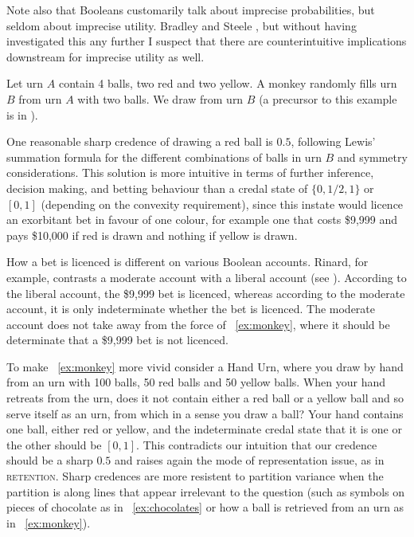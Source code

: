\documentclass[phd,12pt,oneside]{ubcthesis}
\begin{document}
Note also that Booleans customarily talk about imprecise
probabilities, but seldom about imprecise utility. Bradley and Steele
, but without having investigated this
any further I suspect that there are counterintuitive implications
downstream for imprecise utility as well. 

\begin{quotex}
  \label{ex:monkey} Let urn $A$ contain 4
  balls, two red and two yellow. A monkey randomly fills urn $B$ from
  urn $A$ with two balls. We draw from urn $B$ (a precursor to this
  example is in ).
\end{quotex}

One reasonable sharp credence of drawing a red ball is $0.5$,
following Lewis' summation formula for the different combinations of
balls in urn $B$ and symmetry considerations. This solution is more
intuitive in terms of further inference, decision making, and betting
behaviour than a credal state of $\{0,1/2,1\}$ or $[0,1]$ (depending
on the convexity requirement), since this instate would licence an
exorbitant bet in favour of one colour, for example one that costs
\$9,999 and pays \$10,000 if red is drawn and nothing if yellow is
drawn.

How a bet is licenced is different on various Boolean accounts.
Rinard, for example, contrasts a moderate account with a liberal
account (see ). According to the liberal
account, the \$9,999 bet is licenced, whereas according to the
moderate account, it is only indeterminate whether the bet is
licenced. The moderate account does not take away from the force of
{\xample}~\ref{ex:monkey}, where it should be determinate that a \$9,999
bet is not licenced.

To make {\xample}~\ref{ex:monkey} more vivid consider a Hand Urn, where
you draw by hand from an urn with 100 balls, 50 red balls and 50
yellow balls. When your hand retreats from the urn, does it not
contain either a red ball or a yellow ball and so serve itself as an
urn, from which in a sense you draw a ball? Your hand contains one
ball, either red or yellow, and the indeterminate credal state that it
is one or the other should be $[0,1]$. This contradicts our intuition
that our credence should be a sharp $0.5$ and raises again the mode of
representation issue, as in \textsc{retention}. Sharp credences are
more resistent to partition variance when the partition is along lines
that appear irrelevant to the question (such as symbols on pieces of
chocolate as in {\xample}~\ref{ex:chocolates} or how a ball is retrieved
from an urn as in {\xample}~\ref{ex:monkey}).
\end{document}
